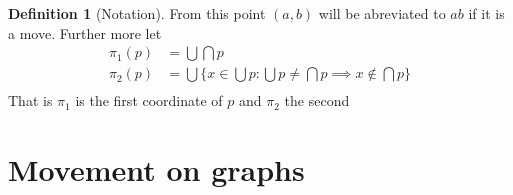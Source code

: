 \documentclass{article}
\theoremstyle{plain}
\theoremstyle{definition}
\newtheorem{definition}[theorem]{Definition}
\begin{document}
\begin{definition}[Notation]\label{def notation}
	From this point $(a,b)$ will be abreviated to $ab$ if it is a
	move. Further more let
	\begin{equation}
	\begin{aligned}
		\pi_1(p) &= \bigcup \bigcap p \\
		\pi_2(p) &= \bigcup \{x \in \bigcup p: \bigcup p \neq
		\bigcap p \implies x \notin \bigcap p\} \\
	\end{aligned}
	\end{equation}
	That is $\pi_1$ is the first coordinate of $p$ and $\pi_2$ the second
\end{definition}
\section{Movement on graphs}
\end{document}

